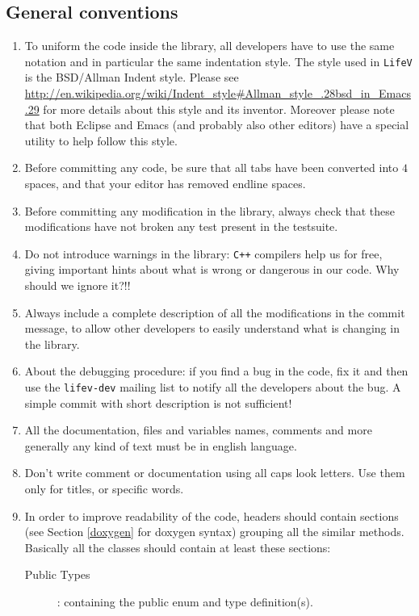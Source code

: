 \documentclass[a4paper]{article}
\begin{document}
\subsection{General conventions}
\begin{enumerate}
  \item To uniform the code inside the library, all developers have to use the same notation and in particular the same indentation style. The style used in \texttt{LifeV} is the BSD/Allman Indent style. Please see \url{http://en.wikipedia.org/wiki/Indent_style#Allman_style_.28bsd_in_Emacs.29} for more details about this style and its inventor. Moreover please note that both Eclipse and Emacs (and probably also other editors) have a special utility to help follow this style.
  \item Before committing any code, be sure that all tabs have been converted into $4$ spaces, and that your editor has removed endline spaces.
  \item Before committing any modification in the library, always check that these modifications have not broken any test present in the testsuite.
  \item Do not introduce warnings in the library: \texttt{C++} compilers help us for free, giving important hints about what is wrong or dangerous in our code. Why should we ignore it?!!
  \item Always include a complete description of all the modifications in the commit message, to allow other developers to easily understand what is changing in the library.
  \item About the debugging procedure: if you find a bug in the code, fix it and then use the \texttt{lifev-dev} mailing list to notify all the developers about the bug. A simple commit with short description is not sufficient!
  \item All the documentation, files and variables names, comments and more generally any kind of text must be in english language.
  \item Don't write comment or documentation using all caps look letters. Use them only for titles, or specific words.
  \item In order to improve readability of the code, headers should contain sections (see Section \ref{doxygen} for doxygen syntax) grouping all the similar methods. Basically all the classes should contain at least these sections:
  \begin{description}
      \item[Public Types]: containing the public enum and type definition(s).

\end{description}
\end{enumerate}
\end{document}
